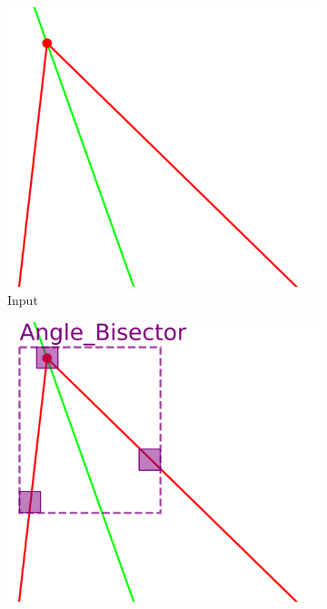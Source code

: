 \begin{figure}[ht]
     \centering
     \begin{subfigure}[b]{0.32\textwidth}
         \centering
         \includegraphics[width=\textwidth]{img/ExampleTrainingData/02_02_input.png}
         \caption{Input}
         \label{fig:training_data_primary_02_02_input}
     \end{subfigure}
     \hfill
     \begin{subfigure}[b]{0.32\textwidth}
         \centering
         \includegraphics[width=\textwidth]{img/ExampleTrainingData/02_02_primary.png}

\end{subfigure}
\end{figure}
